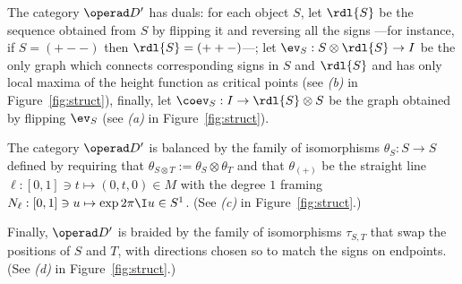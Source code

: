 The category $\RTE$ has duals: for each object $S$, let $\rdl{S}$ be
the sequence obtained from $S$ by flipping it and reversing all the
signs ---for instance, if $S = (+--)$ then $\rdl{S} = (++-)$---; let
$\ev_S: S\otimes\rdl{S} \to I$ be the only graph which connects corresponding
signs in $S$ and $\rdl{S}$ and has only local maxima of the height
function as critical points (see \textsl{(b)} in Figure~\ref{fig:struct}),
finally, let $\coev_S : I \to \rdl{S} \otimes S$ be the graph obtained by
flipping $\ev_S$ (see \textsl{(a)} in Figure~\ref{fig:struct}).

The category $\RTE$ is balanced by the family of isomorphisms $\theta_S: S
\to S$ defined by requiring that $\theta_{S\otimes T} := \theta_S \otimes \theta_T$ and
that $\theta_{(+)}$ be the straight line $\ell: [0,1] \ni t \mapsto (0,t,0) \in M$
with the degree $1$ framing $N_\ell: [0,1] \ni u \mapsto \exp 2\pi\I u \in
S^1$. (See \textsl{(c)} in Figure~\ref{fig:struct}.)

Finally, $\RTE$ is braided by the family of isomorphisms $\tau_{S,T}$
that swap the positions of $S$ and $T$, with directions chosen so to
match the signs on endpoints. (See \textsl{(d)} in
Figure~\ref{fig:struct}.)

